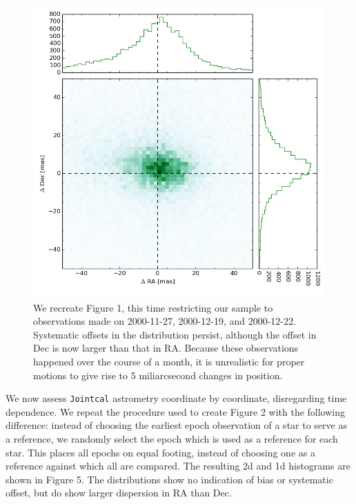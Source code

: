 \documentclass[DM,toc]{lsstdoc}
\begin{document}
\begin{figure}[ht!]
    \includegraphics[width=.9\textwidth]{ra_dec_20001127_20001219_20001222.png}
    \caption{We recreate Figure 1, this time restricting our sample to observations made on 2000-11-27, 2000-12-19, and 2000-12-22. Systematic offsets in the distribution persist, although the offset in Dec is now larger than that in RA. Because these observations happened over the course of a month, it is unrealistic for proper motions to give rise to 5 miliarcsecond changes in position.}
\end{figure}

We now assess {\tt\string Jointcal} astrometry coordinate by coordinate, disregarding time dependence. We repeat the procedure used to create Figure 2 with the following difference: instead of choosing the earliest epoch observation of a star to serve as a reference, we randomly select the epoch which is used as a reference for each star. This places all epochs on equal footing, instead of choosing one as a reference against which all are compared. The resulting 2d and 1d histograms are shown in Figure 5. The distributions show no indication of bias or systematic offset, but do show larger dispersion in RA than Dec.
\end{document}
